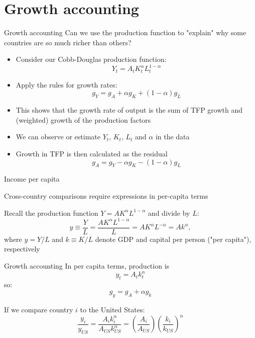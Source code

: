 \documentclass[10pt,handout]{beamer}
\begin{document}
\section{Growth accounting}


\begin{frame}{Growth accounting}
    Can we use the production function to "explain" why some countries are so much richer than others? \pause \medskip

    \begin{itemize}
        \item Consider our Cobb-Douglas production function:
        \[
            Y_t = A_t K_t^\alpha L_t^{1-\alpha}
        \]

        \item Apply the rules for growth rates:
        \[
            g_{Y} = g_{A} + \alpha g_{K} + (1-\alpha) g_{L}
        \]
    
        \item This shows that the growth rate of output is the sum of TFP growth and (weighted) growth of the production factors \smallskip

        \pause\item We can observe or estimate $Y_t$, $K_t$, $L_t$ and $\alpha$ in the data \smallskip
    
        \item Growth in TFP is then calculated as the residual
        \[
            g_{A} = g_{Y} - \alpha g_{K} - (1-\alpha) g_{L}
        \]
    \end{itemize}
\end{frame}


\begin{frame}{Income per capita}

    Cross-country comparisons require expressions in per-capita terms\bigskip

    Recall the production function $Y=A K^\alpha L^{1-\alpha}$ and divide by $L$:
    \begin{equation*}
        y \equiv \frac{Y}{L}=\frac{AK^\alpha L^{1-\alpha}}{L}=A K^\alpha L^{-\alpha}=Ak^\alpha,
    \end{equation*}
    where $y=Y/L$ and $k \equiv K/L$ denote GDP and capital per person ("per capita"), respectively
\end{frame}

\begin{frame}{Growth accounting} 
    In per capita terms, production is
        \[ y_t = A_t k_t^\alpha \]
    so:
    \[
        g_{y} = g_{A} + \alpha g_{k}
    \] \medskip

    If we compare country $i$ to the United States:
    \[
        \frac{y_i}{y_{US}} = \frac{A_i k_i^\alpha}{A_{US} k_{US}^\alpha} = \left( \frac{A_i}{A_{US}} \right) \left( \frac{k_i}{k_{US}} \right) ^\alpha
    \]
\end{frame}
\end{document}
